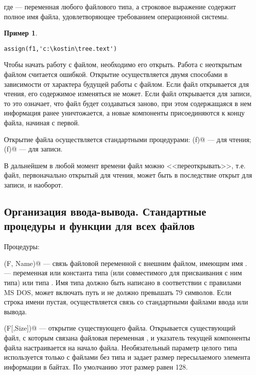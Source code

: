 \documentclass[12pt,a4paper]{article}
\theoremstyle{plain}
\theoremstyle{definition}
\newtheorem*{example}{Пример}
\theoremstyle{remark}
\begin{document}
где \verb@f@ --- переменная любого файлового типа, а строковое выражение \verb@name@ содержит полное имя файла, удовлетворяющее требованием операционной системы.

\begin{example}
~\\
\begin{verbatim}
assign(f1,'c:\kostin\tree.text')
\end{verbatim}
\end{example}

Чтобы начать работу с файлом, необходимо его открыть. Работа с неоткрытым файлом считается ошибкой. Открытие осуществляется двумя способами в зависимости от характера будущей работы с файлом. Если файл открывается для чтения, его содержимое изменяться не может. Если файл открывается для записи, то это означает, что файл будет создаваться заново, при этом содержащаяся в нем информация ранее уничтожается, а новые компоненты присоединяются к концу файла, начиная с первой.

Открытие файла осуществляется стандартными процедурами: \verb@reset(f)@ --- для чтения; \verb@rewrite(f)@ --- для записи.

В дальнейшем в любой момент времени файл можно <<переоткрывать>>, т.е. файл, первоначально открытый для чтения, может быть в последствие открыт для записи, и наоборот.

\subsection{Организация ввода-вывода. Стандартные процедуры и функции для всех файлов}
Процедуры:

\verb@Assign (F, Name)@ --- связь файловой переменной с внешним файлом, имеющим имя \verb@Name@. \verb@Name@ --- переменная или константа типа \verb@string@ (или совместимого для присваивания с ним типа) или типа . Имя типа должно быть написано в соответствии с правилами MS DOS, может включать путь и не должно превышать 79 символов. Если строка имени пустая, осуществляется связь со стандартными файлами ввода или вывода.

\verb@Reset(F[,Size])@ --- открытие существующего файла. Открывается существующий файл, с которым связана файловая переменная \verb@F@, и указатель текущей компоненты файла настраивается на начало файла. Необязательный параметр целого типа \verb@Size@ используется только с файлами без типа и задает размер пересылаемого элемента информации в байтах. По умолчанию этот размер равен 128.
\end{document}
